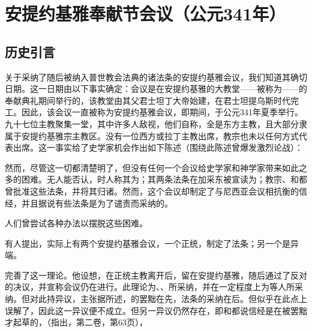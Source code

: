 
\chapter{安提约基雅奉献节会议（公元341年）}



\section{历史引言}

关于采纳了随后被纳入普世教会法典的诸法条的安提约基雅会议，我们知道其确切日期。这一日期由以下事实确定：会议是在安提约基雅的大教堂——被称为——的奉献典礼期间举行的，该教堂由其父君士坦丁大帝始建，在君士坦提乌斯时代完工。因此，该会议一直被称为安提约基雅会议，即期间，于公元341年夏季举行。九十七位主教聚集一堂，其中许多人敌视，他们自称，全是东方主教，且大部分隶属于安提约基雅宗主教区。没有一位西方或拉丁主教出席，教宗也未以任何方式代表出席。这一事实给了史学家机会作出如下陈述（围绕此陈述曾爆发激烈论战）：\par

然而，尽管这一切都清楚明了，但没有任何一个会议给史学家和神学家带来如此之多的困难。无人能否认，时人称其为；其两条法条在加采东被宣读为；教宗、和都曾批准这些法条，并将其归诸。然而，这个会议却制定了与尼西亚会议相抗衡的信经，并且据说有些法条是为了谴责而采纳的。\par

人们曾尝试各种办法以摆脱这些困难。\par

有人提出，实际上有两个安提约基雅会议，一个正统，制定了法条；另一个是异端。\par

完善了这一理论。他设想，在正统主教离开后，留在安提约基雅，随后通过了反对的决议，并宣称会议仍在进行。此理论为、、所采纳，并在一定程度上为等人所采纳。但对此持异议，主张据所述，的罢黜在先，法条的采纳在后。但似乎在此点上误解了，因此这一异议便不成立。但另一异议仍然存在，即和都说信经是在被罢黜才起草的，（指出，第二卷，第63页），\par

